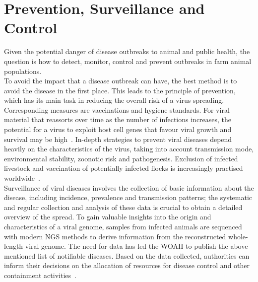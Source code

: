 \section{Prevention, Surveillance and Control}
Given the potential danger of disease outbreaks to animal and public health, the question is how to detect, monitor, control and prevent outbreaks in farm animal populations. \\
To avoid the impact that a disease outbreak can have, the best method is to avoid the disease in the first place. This leads to the principle of prevention, which has its main task in reducing the overall risk of a virus spreading. Corresponding measures are vaccinations and hygiene standards. For viral material that reassorts over time as the number of infections increases, the potential for a virus to exploit host cell genes that favour viral growth and survival may be high~\cite{fenner2017maclachlan}. %
In-depth strategies to prevent viral diseases depend heavily on the characteristics of the virus, taking into account transmission mode, environmental stability, zoonotic risk and pathogenesis. Exclusion of infected livestock and vaccination of potentially infected flocks is increasingly practised worldwide~\cite{fenner2017maclachlan}. \\ %
Surveillance of viral diseases involves the collection of basic information about the disease, including incidence, prevalence and transmission patterns; the systematic and regular collection and analysis of these data is crucial to obtain a detailed overview of the spread. To gain valuable insights into the origin and characteristics of a viral genome, samples from infected animals are sequenced with modern \ac{NGS} methods to derive information from the reconstructed whole-length viral genome. The need for data has led the \ac{WOAH} to publish the above-mentioned list of notifiable diseases. Based on the data collected, authorities can inform their decisions on the allocation of resources for disease control and other containment activities~\cite{fenner2017maclachlan, who2017one}.
